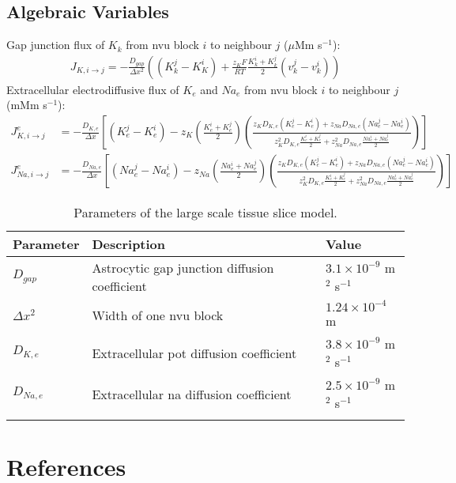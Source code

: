 \documentclass[11pt]{elsarticle}
\newcommand{\e}[1]{\times 10^{#1}}
\newcommand{\psec}{s$^{-1}$\xspace}
\newcommand\ddfrac[2]{\frac{\displaystyle #1}{\displaystyle #2}}
\newcommand{\na}{\gls{na}\xspace}
\newcommand{\pot}{\gls{pot}\xspace}
\begin{document}
		\subsection{Algebraic Variables}
Gap junction flux of $K_k$ from \gls{nvu} block $i$ to neighbour $j$ ($\mu$Mm \psec):
\begin{align}
J_{K,i \to j} = -\frac{D_{gap}}{\Delta x^2} \left( (K_k^j - K_K^i) + \frac{z_K F}{RT} \frac{K_k^i + K_k^j}{2} (v_k^j - v_k^i) \right)
\end{align}
%
Extracellular electrodiffusive flux of $K_e$ and $Na_e$ from \gls{nvu} block $i$ to neighbour $j$ (mMm \psec):
\begin{align}
J^{e}_{K,i\to j} &= -\frac{D_{K,e}}{\Delta x} \left[ 
(K_e^j - K_e^i) - z_K \left(\frac{K_e^i + K_e^j}{2}\right) 
\left(   \ddfrac{z_K D_{K,e} (K_e^j - K_e^i) + z_{Na} D_{Na,e} (Na_e^j - Na_e^i)}
{z_K^2 D_{K,e} \frac{K_e^i + K_e^j}{2} + z_{Na}^2 D_{Na,e} \frac{Na_e^i + Na_e^j}{2} }
\right) 
\right]   
\\
J^{e}_{Na,i\to j} &= -\frac{D_{Na,e}}{\Delta x} \left[ 
(Na_e^j - Na_e^i) - z_{Na} \left(\frac{Na_e^i + Na_e^j}{2}\right) 
\left(   \ddfrac{z_K D_{K,e} (K_e^j - K_e^i) + z_{Na} D_{Na,e} (Na_e^j - Na_e^i)}
{z_K^2 D_{K,e} \frac{K_e^i + K_e^j}{2} + z_{Na}^2 D_{Na,e} \frac{Na_e^i + Na_e^j}{2} }
\right) 
\right]   
\end{align}
\pagebreak
\begin{longtable}[h!]{ p{0.12\linewidth}   p{0.66\linewidth}   p{0.22\linewidth} }
	\hline
	Parameter & Description & Value \\
	\hline
$D_{gap}$ 		& Astrocytic gap junction diffusion coefficient & $3.1\e{-9}$ m$^2$ \psec \\
$\Delta x^2$ 	& Width of one \gls{nvu} block & $1.24\e{-4}$ m \\
$D_{K,e}$ 		& Extracellular \pot diffusion coefficient & $3.8\e{-9}$ m$^2$ \psec \\
$D_{Na,e}$ 		& Extracellular \na diffusion coefficient & $2.5\e{-9}$ m$^2$ \psec \\
\hline
\caption{Parameters of the large scale tissue slice model.}
\end{longtable}

\section*{References}


\end{document}
